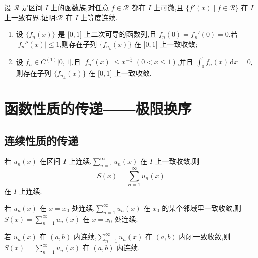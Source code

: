 \documentclass[../数学分析培优讲义.tex]{subfiles}
\begin{document}
\begin{example}
设 $\mathscr R$ 是区间 $I$ 上的函数族,对任意 $f\in\mathscr R$ 都在 $I$ 上可微,且 $\{f'(x)\mid f\in\mathscr R\}$ 在 $I$ 上一致有界.证明:$\mathscr R$ 在 $I$ 上等度连续.
\end{example}
\exampleblank

\begin{example}
\begin{enumerate}[label=(\arabic*)]
    \item 设 $\{f_n(x)\}$ 是 $\lbrack 0,1\rbrack$ 上二次可导的函数列,且 $f_n(0)=f_n'(0)=0$.若 $|f_n''(x)|\leq1$,则存在子列 $\{f_{n_k}(x)\}$ 在 $\lbrack 0,1\rbrack$ 上一致收敛;
    \item 设 $f_n\in C^{(1)}\lbrack 0,1\rbrack$,且 $|f_n'(x)|\leq x^{-\frac{1}{2}}$ $(0<x\leq1)$,并且 $\displaystyle\int_0^1f_n(x)\,\mathrm{d}x=0$,则存在子列 $\{f_{n_k}(x)\}$ 在 $\lbrack 0,1\rbrack$ 上一致收敛.
\end{enumerate}
\end{example}
\exampleblank


\newpage

\section{函数性质的传递——极限换序}


\subsection{连续性质的传递}

\begin{theorem}[\markstar]
若 $u_n(x)$ 在区间 $I$ 上连续,$\displaystyle\sum\limits_{n=1}^{\infty}u_n(x)$ 在 $I$ 上一致收敛,则
\[
    S(x)=\sum\limits_{n=1}^{\infty}u_n(x)
\]
在 $I$ 上连续.
\end{theorem}

\begin{theorem}[\markstar]
若 $u_n(x)$ 在 $x=x_0$ 处连续,$\displaystyle\sum\limits_{n=1}^{\infty}u_n(x)$ 在 $x_0$ 的某个邻域里一致收敛,则 $S(x)=\displaystyle\sum\limits_{n=1}^{\infty}u_n(x)$ 在 $x=x_0$ 处连续.
\end{theorem}

\begin{theorem}[\markstar]
若 $u_n(x)$ 在 $(a,b)$ 内连续,$\displaystyle\sum\limits_{n=1}^{\infty}u_n(x)$ 在 $(a,b)$ 内闭一致收敛,则 $S(x)=\displaystyle\sum\limits_{n=1}^{\infty}u_n(x)$ 在 $(a,b)$ 内连续.
\end{theorem}
\end{document}
